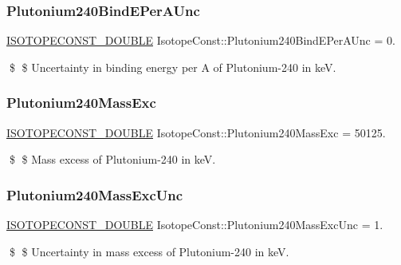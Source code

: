 \subsubsection{\texorpdfstring{Plutonium240\+Bind\+E\+Per\+A\+Unc}{Plutonium240BindEPerAUnc}}
{\footnotesize\ttfamily \mbox{\hyperlink{group___isotope_const-_macros_ga8f45a7272ce02c0b4c65c44636ed719a}{I\+S\+O\+T\+O\+P\+E\+C\+O\+N\+S\+T\+\_\+\+D\+O\+U\+B\+LE}} Isotope\+Const\+::\+Plutonium240\+Bind\+E\+Per\+A\+Unc = 0.}

\$ \$ Uncertainty in binding energy per A of Plutonium-\/240 in keV. \mbox{\label{group___isotope_const-_plutonium-_pu240_ga51b2b95c024cd607e34d0a0f23798fc3}} 
\subsubsection{\texorpdfstring{Plutonium240\+Mass\+Exc}{Plutonium240MassExc}}
{\footnotesize\ttfamily \mbox{\hyperlink{group___isotope_const-_macros_ga8f45a7272ce02c0b4c65c44636ed719a}{I\+S\+O\+T\+O\+P\+E\+C\+O\+N\+S\+T\+\_\+\+D\+O\+U\+B\+LE}} Isotope\+Const\+::\+Plutonium240\+Mass\+Exc = 50125.}

\$ \$ Mass excess of Plutonium-\/240 in keV. \mbox{\label{group___isotope_const-_plutonium-_pu240_gab02ab2398470e8dbd7febd46c0b0576a}} 
\subsubsection{\texorpdfstring{Plutonium240\+Mass\+Exc\+Unc}{Plutonium240MassExcUnc}}
{\footnotesize\ttfamily \mbox{\hyperlink{group___isotope_const-_macros_ga8f45a7272ce02c0b4c65c44636ed719a}{I\+S\+O\+T\+O\+P\+E\+C\+O\+N\+S\+T\+\_\+\+D\+O\+U\+B\+LE}} Isotope\+Const\+::\+Plutonium240\+Mass\+Exc\+Unc = 1.}

\$ \$ Uncertainty in mass excess of Plutonium-\/240 in keV. \mbox{\label{group___isotope_const-_plutonium-_pu240_ga66ff89f0b360eb6008a16902817c3bb3}} 
